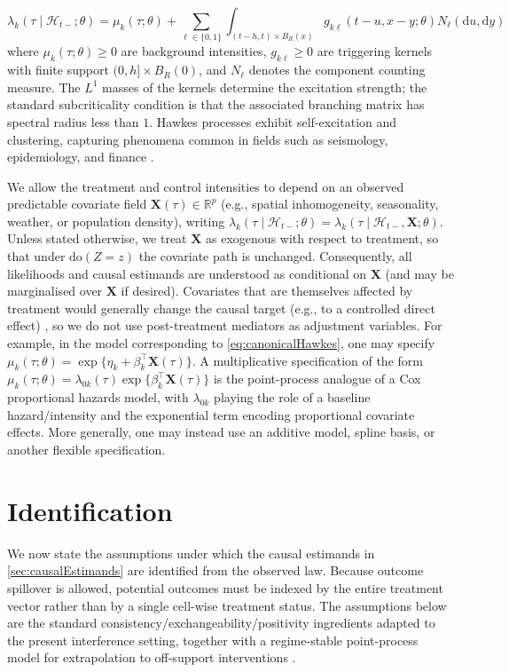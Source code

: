 \documentclass{statsoc}
\newcommand{\dd}{\mathrm{d}}
\newcommand{\1}{\mathbbm{1}}
\newcommand{\CovX}{\mathbf{X}}
\newcommand{\Fobs}{\mathcal H}
\newcommand{\Nproc}{N}
\begin{document}
\begin{equation}\label{eq:canonicalHawkes}
\lambda_k(\tau\mid\Fobs_{t-};\theta)
= \mu_k(\tau;\theta)+\sum_{\ell\in\{0,1\}}\int_{(t-h,t)\times B_R(x)}
g_{k\ell}(t-u,x-y;\theta) \Nproc_\ell(\dd u,\dd y)
\end{equation}
where \(\mu_k(\tau;\theta)\ge 0\) are background intensities, \(g_{k\ell}\ge 0\) are triggering kernels with finite support
\((0,h]\times B_R(0)\), and \(\Nproc_\ell\) denotes the component counting measure.  The \(L^1\) masses of the kernels determine the excitation strength; the standard subcriticality condition is that the associated branching matrix has spectral radius less than \(1\). Hawkes processes exhibit self-excitation and clustering, capturing phenomena common in fields such as seismology, epidemiology, and finance \citep{bacry2015hawkes,reinhart2018review}.

We allow the treatment and control intensities to depend on an observed predictable covariate field \(\CovX(\tau)\in\mathbb R^p\) (e.g., spatial inhomogeneity, seasonality, weather, or population density), writing
\(
\lambda_k(\tau\mid\Fobs_{t-};\theta)
=
\lambda_k(\tau\mid\Fobs_{t-},\CovX;\theta).
\)
Unless stated otherwise, we treat \(\CovX\) as exogenous with respect to treatment, so that under \(\mathrm{do}(Z=z)\) the covariate path is unchanged. Consequently, all likelihoods and causal estimands are understood as conditional on \(\CovX\) (and may be marginalised over \(\CovX\) if desired). Covariates that are themselves affected by treatment would generally change the causal target (e.g., to a controlled direct effect) \citep{robins1992identifiability}, so we do not use post-treatment mediators as adjustment variables. For example, in the model corresponding to \cref{eq:canonicalHawkes}, one may specify
\(
\mu_k(\tau;\theta)=\exp\{\eta_k+\beta_k^\top \CovX(\tau)\}. 
\)
A multiplicative specification of the form \(\mu_k(\tau;\theta)=\lambda_{0k}(\tau)\exp\{\beta_k^\top \CovX(\tau)\}\) is the point-process analogue of a Cox proportional hazards model, with \(\lambda_{0k}\) playing the role of a baseline hazard/intensity and the exponential term encoding proportional covariate effects. More generally, one may instead use an additive model, spline basis, or another flexible specification.
\section{Identification}\label{sec:identification}

We now state the assumptions under which the causal estimands in \cref{sec:causalEstimands} are identified from the observed law. Because outcome spillover is allowed, potential outcomes must be indexed by the entire treatment vector rather than by a single cell-wise treatment status. The assumptions below are the standard consistency/exchangeability/positivity ingredients adapted to the present interference setting, together with a regime-stable point-process model for extrapolation to off-support interventions \citep{pearl2009causal,robins1992identifiability}.
\end{document}
